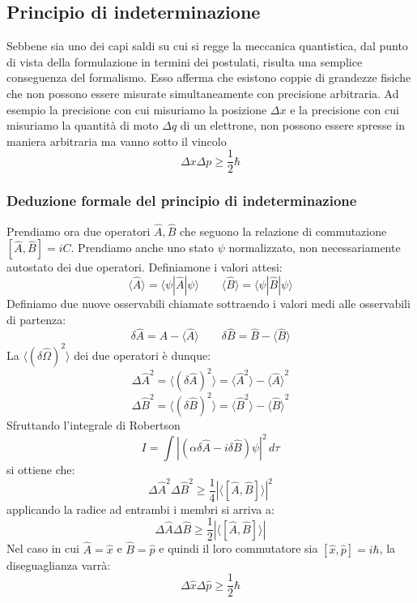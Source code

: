 \subsection{Principio di indeterminazione}
Sebbene sia uno dei capi saldi su cui si regge la meccanica quantistica, dal punto di vista della formulazione in termini dei postulati, risulta una semplice conseguenza del formalismo. Esso afferma che esistono coppie di grandezze fisiche che non possono essere misurate simultaneamente con precisione arbitraria. Ad esempio la precisione con cui misuriamo la posizione $\Delta x$ e la precisione con cui misuriamo la quantità di moto $\Delta q$ di un elettrone, non possono essere spresse in maniera arbitraria ma vanno sotto il vincolo
$$ \Delta x \Delta p \ge \frac{1}{2} \hbar$$

\subsubsection{Deduzione formale del principio di indeterminazione}
Prendiamo ora due operatori $\hat{A}, \hat{B}$ che seguono la relazione di commutazione $[\hat{A}, \hat{B}] = iC$. Prendiamo anche uno stato $\psi$ normalizzato, non necessariamente autostato dei due operatori. Definiamone i valori attesi:
$$\langle \hat{A} \rangle = \langle \psi | \hat{A} | \psi \rangle \qquad \langle \hat{B} \rangle = \langle \psi | \hat{B} | \psi \rangle$$
Definiamo due nuove osservabili chiamate  sottraendo i valori medi alle osservabili di partenza:
$$\delta \hat{A} = \hat{A} - \langle \hat{A} \rangle \qquad \delta \hat{B} = \hat{B} - \langle \hat{B} \rangle$$
La  $\langle (\delta\hat{\Omega})^2 \rangle$ dei due operatori è dunque:
$${\Delta \hat{A}}^2 = \langle (\delta \hat{A})^2 \rangle = \langle \hat{A}^2 \rangle - {\langle \hat{A} \rangle}^2 $$
$${\Delta \hat{B}}^2 = \langle (\delta \hat{B})^2 \rangle = \langle \hat{B}^2 \rangle - {\langle \hat{B} \rangle}^2$$
Sfruttando l'integrale di Robertson
$$ I = \int {|(\alpha \delta \hat{A} - i \delta \hat{B})\psi|}^2 \, d\tau$$
si ottiene che:
$$ {\Delta \hat{A}}^2 {\Delta \hat{B}}^2 \ge \frac{1}{4} {|\langle[\hat{A}, \hat{B}]\rangle|}^2$$
applicando la radice ad entrambi i membri si arriva a:
$$ \Delta \hat{A} \Delta \hat{B} \ge \frac{1}{2} |\langle[\hat{A}, \hat{B}]\rangle|$$
Nel caso in cui $\hat{A} = \hat{x}$ e $\hat{B} = \hat{p}$ e quindi il loro commutatore sia $[\hat{x}, \hat{p}] = i \hbar$, la diseguaglianza varrà:
$$ \Delta \hat{x} \Delta \hat{p} \ge \frac{1}{2} \hbar$$
